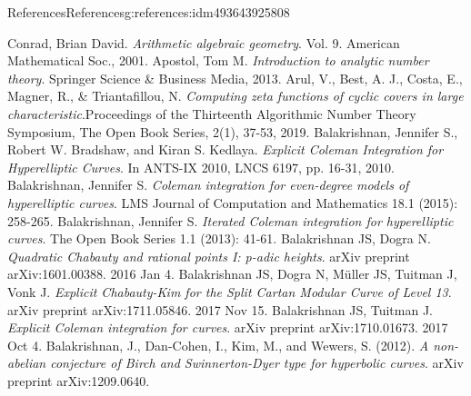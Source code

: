 \documentclass[oneside,10pt,]{book}
\numberwithin{equation}{section}
\begin{document}
\begin{references-chapter-numberless}{References}{}{References}{}{}{g:references:idm493643925808}
\begin{thebibliography}{9}
\hypertarget{x:biblio:bib-arith-alg-geom}{}Conrad, Brian David. \textit{Arithmetic algebraic geometry}. Vol. 9. American Mathematical Soc., 2001.
\hypertarget{x:biblio:bib-apostol}{}Apostol, Tom M. \textit{Introduction to analytic number theory}. Springer Science \& Business Media, 2013.
\hypertarget{x:biblio:bib-arul-bcmt}{}Arul, V., Best, A. J., Costa, E., Magner, R., \& Triantafillou, N. \textit{Computing zeta functions of cyclic covers in large characteristic}.Proceedings of the Thirteenth Algorithmic Number Theory Symposium, The Open Book Series, 2(1), 37-53, 2019.
\hypertarget{x:biblio:bib-balakrishnan-bradshaw-kedlaya}{}Balakrishnan, Jennifer S., Robert W. Bradshaw, and Kiran S. Kedlaya. \textit{Explicit Coleman Integration for Hyperelliptic Curves}. In ANTS-IX 2010, LNCS 6197, pp. 16-31, 2010.
\hypertarget{x:biblio:bib-balakrishnan-even}{}Balakrishnan, Jennifer S. \textit{Coleman integration for even-degree models of hyperelliptic curves}. LMS Journal of Computation and Mathematics 18.1 (2015): 258-265.
\hypertarget{x:biblio:bib-balakrishnan-iterated}{}Balakrishnan, Jennifer S. \textit{Iterated Coleman integration for hyperelliptic curves}. The Open Book Series 1.1 (2013): 41-61.
\hypertarget{x:biblio:bib-balakrishnan-dogra}{}Balakrishnan JS, Dogra N. \textit{Quadratic Chabauty and rational points I: p-adic heights}. arXiv preprint arXiv:1601.00388. 2016 Jan 4.
\hypertarget{x:biblio:bib-balakrishnan-dogra-muller-tuitman-vonk}{}Balakrishnan JS, Dogra N, Müller JS, Tuitman J, Vonk J. \textit{Explicit Chabauty-Kim for the Split Cartan Modular Curve of Level 13}. arXiv preprint arXiv:1711.05846. 2017 Nov 15.
\hypertarget{x:biblio:bib-balakrishnan-tuitman}{}Balakrishnan JS, Tuitman J. \textit{Explicit Coleman integration for curves}. arXiv preprint arXiv:1710.01673. 2017 Oct 4.
\hypertarget{x:biblio:bib-bala-nonab}{}Balakrishnan, J., Dan-Cohen, I., Kim, M., and Wewers, S. (2012). \textit{A non-abelian conjecture of Birch and Swinnerton-Dyer type for hyperbolic curves}. arXiv preprint arXiv:1209.0640.

\end{thebibliography}
\end{references-chapter-numberless}
\end{document}
